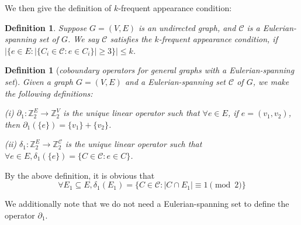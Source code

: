 \documentclass[10pt,fleqn]{article}
\newtheorem{definition}[theorem]{Definition}
\newcommand{\Z}{\mathbb{Z}}
\newcommand{\mc}[1]{\mathcal{#1}}
\begin{document}
	We then give the definition of $k$-frequent appearance condition:
	\begin{definition}\label{def24}
		Suppose $G=(V,E)$ is an undirected graph, and $\mc{C}$ is a Eulerian-spanning set of $G$. We say $\mc{C}$ satisfies the $k$-frequent appearance condition, if $|\{e\in E:|\{C_i\in\mc{C}:e\in C_i\}|\geq 3\}|\leq k$.
	\end{definition}
	\begin{definition}[\it{coboundary operators for general graphs with a Eulerian-spanning set}]\label{def25}
		Given a graph $G=(V,E)$ and a Eulerian-spanning set $\mc{C}$ of $G$, we make the following definitions:\par
		(i) $\partial_1:\Z_2^{E}\to \Z_2^V$ is the unique linear operator such that $\forall e\in E$, if $e=(v_1,v_2)$, then $\partial_1(\{e\})=\{v_1\}+\{v_2\}$. \par
		(ii) $\delta_1:\Z_2^{E}\to \Z_2^{\mc{C}}$ is the unique linear operator such that $\forall e\in E,\delta_1(\{e\})=\{C\in\mc{C}:e\in C\}$. \par
	\end{definition} \par
	By the above definition, it is obvious that
	$$\forall E_1\subseteq E,\delta_1(E_1)=\{C\in\mc{C}:|C\cap E_1|\equiv 1\pmod{2}\}$$ \par
	We additionally note that we do not need a Eulerian-spanning set to define the operator $\partial_1$.
	
	
\end{document}
